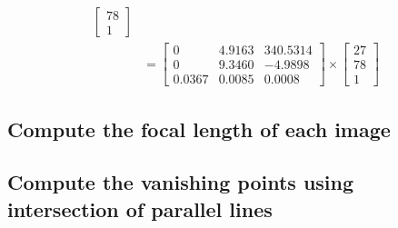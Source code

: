 \documentclass[12pt, oneside]{article}
\begin{document}
\begin{align*}
\begin{bmatrix}
        78 \\
        1 
    \end{bmatrix} \\
&= \begin{bmatrix}
    0   &  4.9163   &   340.5314 \\
    0   &  9.3460   &   -4.9898\\
    0.0367   &  0.0085   &   0.0008
    \end{bmatrix} 
\times 
    \begin{bmatrix}
        27 \\
        78 \\
        1 
    \end{bmatrix}
\end{align*} 
  
\subsection{Compute the focal length of each image}
\subsection{Compute the vanishing points using intersection of parallel lines}
\end{document}
